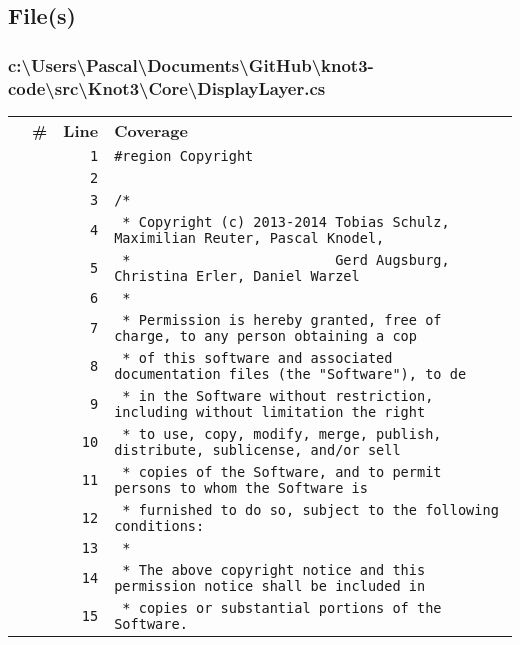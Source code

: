 \documentclass[a4paper,10pt]{article}
\begin{document}
\subsection{File(s)}
\subsubsection{c:\textbackslash Users\textbackslash Pascal\textbackslash Documents\textbackslash GitHub\textbackslash knot3-code\textbackslash src\textbackslash Knot3\textbackslash Core\textbackslash DisplayLayer.cs}
\begin{longtable}[l]{lrrl}
\textbf{} & \textbf{\#} & \textbf{Line} & \textbf{Coverage}\\
\cellcolor{gray} &  & \verb~1~ & \verb~#region Copyright~\\
\cellcolor{gray} &  & \verb~2~ & \verb~~\\
\cellcolor{gray} &  & \verb~3~ & \verb~/*~\\
\cellcolor{gray} &  & \verb~4~ & \verb~ * Copyright (c) 2013-2014 Tobias Schulz, Maximilian Reuter, Pascal Knodel,~\\
\cellcolor{gray} &  & \verb~5~ & \verb~ *                         Gerd Augsburg, Christina Erler, Daniel Warzel~\\
\cellcolor{gray} &  & \verb~6~ & \verb~ *~\\
\cellcolor{gray} &  & \verb~7~ & \verb~ * Permission is hereby granted, free of charge, to any person obtaining a cop~\\
\cellcolor{gray} &  & \verb~8~ & \verb~ * of this software and associated documentation files (the "Software"), to de~\\
\cellcolor{gray} &  & \verb~9~ & \verb~ * in the Software without restriction, including without limitation the right~\\
\cellcolor{gray} &  & \verb~10~ & \verb~ * to use, copy, modify, merge, publish, distribute, sublicense, and/or sell~\\
\cellcolor{gray} &  & \verb~11~ & \verb~ * copies of the Software, and to permit persons to whom the Software is~\\
\cellcolor{gray} &  & \verb~12~ & \verb~ * furnished to do so, subject to the following conditions:~\\
\cellcolor{gray} &  & \verb~13~ & \verb~ *~\\
\cellcolor{gray} &  & \verb~14~ & \verb~ * The above copyright notice and this permission notice shall be included in ~\\
\cellcolor{gray} &  & \verb~15~ & \verb~ * copies or substantial portions of the Software.~\\

\end{longtable}
\end{document}
